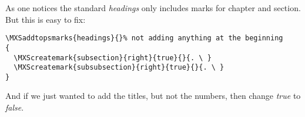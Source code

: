\documentclass[
a4paper,
11pt,
article
]{memoir}
\makeatletter
\newcommand*\Arg@s[1]{\textnormal{\texttt{#1}}}%
\newcommand*\Arg@n[1]{\textnormal{$\langle$\textit{#1}$\rangle$}}%
\newcommand*\Arg{\@ifstar{\Arg@s}{\Arg@n}}%
\newcommand*\marg@s[1]{\textnormal{\texttt{\{#1\}}}}
\newcommand*\marg@n[1]{%
  \textnormal{\texttt{\{}$\langle$\textit{#1}$\rangle$\texttt{\}}}%
}
\renewcommand*\marg{\@ifstar{\marg@s}{\marg@n}}
\newcommand*\oarg@s[1]{\textnormal{\texttt{[#1]}}}
\newcommand*\oarg@n[1]{%
  \textnormal{\texttt{[}$\langle$\textit{#1}$\rangle$\texttt{]}}%
}
\renewcommand*\oarg{\@ifstar{\oarg@s}{\oarg@n}}
\newenvironment{syntax}{%
  \vskip.5\onelineskip%
  \begin{adjustwidth}{\parindent}{0pt}
    \parindent=0pt%
    \obeylines%
    \let\\=\relax%
  }{%
  \end{adjustwidth}%
  \vskip.5\onelineskip%
}
\makeatother
\begin{document}
As one notices the standard \emph{headings} only includes marks for
chapter and section. But this is easy to fix:
\begin{verbatim}
\MXSaddtopsmarks{headings}{}% not adding anything at the beginning
{
  \MXScreatemark{subsection}{right}{true}{}{. \ }
  \MXScreatemark{subsubsection}{right}{true}{}{. \ }
}
\end{verbatim}
And if we just wanted to add the titles, but not the numbers, then
change \emph{true} to \emph{false}.



\end{document}
